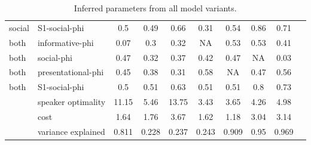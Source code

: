 \documentclass[12pt]{article}
\newcommand{\ejy}[1]{\textcolor{Red}{[ejy: #1]}}
\begin{document}
\begin{landscape}
\begin{table}[]
\begin{tabular}{llcccccccc}
social                 & S1-social-phi      & 0.5              & 0.49        & 0.66                & 0.31                   & 0.54                & 0.86                        & 0.71                                \\
both                   & informative-phi    & 0.07             & 0.3         & 0.32                & NA                     & 0.53                & 0.53                        & 0.41                                \\
both                   & social-phi         & 0.47             & 0.32        & 0.37                & 0.42                   & 0.47                & NA                          & 0.03                                \\
both                   & presentational-phi & 0.45             & 0.38        & 0.31                & 0.58                   & NA                  & 0.47                        & 0.56                                \\
both                   & S1-social-phi      & 0.5              & 0.51        & 0.63                & 0.51                   & 0.51                & 0.8                         & 0.73                                \\
                       & speaker optimality & 11.15            & 5.46        & 13.75               & 3.43                   & 3.65                & 4.26                        & 4.98                                \\
                       & cost               & 1.64             & 1.76        & 3.67                & 1.62                   & 1.18                & 3.04                        & 3.14         			\\
                       & variance explained & 0.811            & 0.228       & 0.237               & 0.243                  & 0.909               & 0.95                        & 0.969                              
                      
\end{tabular}
\caption{Inferred parameters from all model variants.}
\label{table:params}
\end{table}
\end{landscape}

%
%
\end{document}
